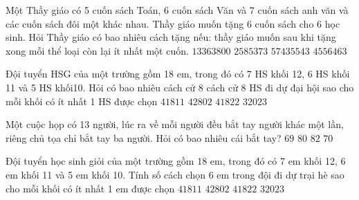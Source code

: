 \begin{ex}
	Một Thầy giáo có 5 cuốn sách Toán, 6 cuốn sách Văn và 7 cuốn sách anh văn và các cuốn sách đôi một khác nhau. Thầy giáo muốn tặng 6 cuốn sách cho 6 học sinh. Hỏi Thầy giáo có bao nhiêu cách tặng nếu: thầy giáo muốn sau khi tặng xong mỗi thể loại còn lại ít nhất một cuốn.
	\choice
	{\True $13363800$}
	{$2585373$}
	{$57435543$}
	{$4556463$}
\end{ex}

\begin{ex}
	Đội tuyển HSG của một trường gồm 18 em, trong đó có 7 HS khối 12, 6 HS khối 11 và 5 HS khối10. Hỏi có bao nhiêu cách cử 8 cách cử 8 HS đi dự đại hội sao cho mỗi khối có ít nhất 1 HS được chọn
	\choice
	{\True $41811$}
	{$42802$}
	{$41822$}
	{$32023$}
\end{ex}

\begin{ex}
	Một cuộc họp có 13 người, lúc ra về mỗi người đều bắt tay người khác một lần, riêng chủ tọa chỉ bắt tay ba người. Hỏi có bao nhiêu cái bắt tay?
	\choice
	{\True $69$}
	{$80$}
	{$82$}
	{$70$}
\end{ex}

\begin{ex}
	Đội tuyển học sinh giỏi của một trường gồm 18 em, trong đó có 7 em khối 12, 6 em khối 11 và 5 em khối 10. Tính số cách chọn 6 em trong đội đi dự trại hè sao cho mỗi khối có ít nhất 1 em được chọn
	\choice
	{\True $41811$}
	{$42802$}
	{$41822$}
	{$32023$}
\end{ex}

